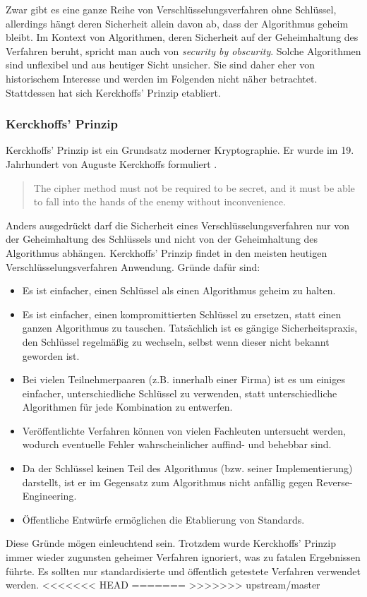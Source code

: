 Zwar gibt es eine ganze Reihe von Verschlüsselungsverfahren ohne
Schlüssel, allerdings hängt deren Sicherheit allein davon ab, dass der
Algorithmus geheim bleibt. Im Kontext von Algorithmen, deren Sicherheit
auf der Geheimhaltung des Verfahren beruht, spricht man auch von
\emph{security by obscurity}. Solche Algorithmen sind unflexibel und aus
heutiger Sicht unsicher. Sie sind daher eher von historischem Interesse
und werden im Folgenden nicht näher betrachtet. Stattdessen hat sich
Kerckhoffs' Prinzip etabliert.

\subsubsection{Kerckhoffs' Prinzip}

Kerckhoffs' Prinzip ist ein Grundsatz moderner Kryptographie. Er wurde
im 19. Jahrhundert von Auguste Kerckhoffs formuliert
\cite{Kerckhoffs1883}. 
\begin{quote}
  \grqq{}The cipher method must not be required to be secret, and it
  must be able to fall into the hands of the enemy without
  inconvenience.\grqq
\end{quote}
Anders ausgedrückt darf die Sicherheit eines Verschlüsselungsverfahren
nur von der Geheimhaltung des Schlüssels und nicht von der Geheimhaltung
des Algorithmus abhängen.  Kerckhoffs' Prinzip findet in den meisten
heutigen Verschlüsselungsverfahren Anwendung. Gründe dafür sind:
\begin{itemize}
\item Es ist einfacher, einen Schlüssel als einen Algorithmus
  geheim zu halten.
\item Es ist einfacher, einen kompromittierten Schlüssel zu
  ersetzen, statt einen ganzen Algorithmus zu tauschen. Tatsächlich ist es
  gängige Sicherheitspraxis, den Schlüssel regelmäßig zu wechseln, selbst
  wenn dieser nicht bekannt geworden ist.
\item Bei vielen Teilnehmerpaaren (z.B. innerhalb einer Firma)
  ist es um einiges einfacher, unterschiedliche Schlüssel zu verwenden,
  statt unterschiedliche Algorithmen für jede Kombination zu entwerfen.
\item Veröffentlichte Verfahren können von vielen Fachleuten
  untersucht werden, wodurch eventuelle Fehler wahrscheinlicher auffind-
  und behebbar sind.
\item Da der Schlüssel keinen Teil des Algorithmus (bzw. seiner
  Implementierung) darstellt, ist er im Gegensatz zum Algorithmus nicht
  anfällig gegen Reverse-Engineering.
\item Öffentliche Entwürfe ermöglichen die Etablierung von
  Standards.
\end{itemize} 
Diese Gründe mögen einleuchtend sein. Trotzdem wurde Kerckhoffs' Prinzip
immer wieder zugunsten geheimer Verfahren ignoriert, was zu fatalen
Ergebnissen führte. Es sollten nur standardisierte und öffentlich
getestete Verfahren verwendet werden.
<<<<<<< HEAD
=======
>>>>>>> upstream/master
